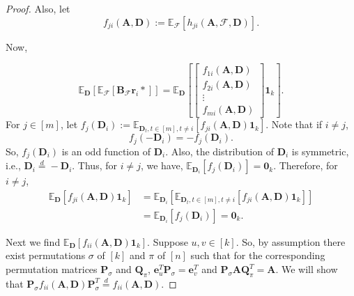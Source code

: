 \documentclass[journal,draftcls,onecolumn]{IEEEtran}
\theoremstyle{mystyle}
\newcommand{\bfD}{\mathbf{D}}
\newcommand{\bfQ}{\mathbf{Q}}
\newcommand{\bfA}{\mathbf{A}}
\newcommand{\bfB}{\mathbf{B}}
\newcommand{\bfP}{\mathbf{P}}
\newcommand{\cF}{\mathcal{F}}
\begin{document}
\begin{proof}
Also, let 
\[ f_{ji}( \mathbf{A}, \mathbf{D}) := \mathbb{E}_{\mathcal{F}}\left[h_{ji}(\mathbf{A}, \mathcal{F}, \mathbf{D})\right].\]

Now,

\[ \mathbb{E}_{\mathbf{D}} [ \mathbb{E}_{\mathcal{F}}[\mathbf{B}_{\mathcal{F}} \mathbf{r}_i*]] = \mathbb{E}_{\mathbf{D}} \left[ \begin{bmatrix}f_{1i}(\mathbf{A}, \mathbf{D}) \\ f_{2i}(\mathbf{A}, \mathbf{D})\\ \vdots \\ f_{mi}(\mathbf{A}, \mathbf{D}) \end{bmatrix} \mathbf{1}_k\right] .\]
For $j \in [m]$, let $f_j(\mathbf{D}_i)  := \mathbb{E}_{\mathbf{D}_t, t\in [m], t \ne i}[f_{ji}(\mathbf{A}, \mathbf{D}) \mathbf{1}_k] $. Note that if $i \ne j$, 
\[f_j(-\mathbf{D}_i) = - f_j(\mathbf{D}_i).\]
So, $f_j(\mathbf{D}_i)$ is an odd function of $\mathbf{D}_i$. Also, the distribution of $\mathbf{D}_i$ is symmetric, i.e., $\bfD_i \overset{d}= - \bfD_i$. Thus, for $i \ne j$, we have, $\mathbb{E}_{\mathbf{D}_i}[f_j(\mathbf{D}_i)] =  \mathbf{0}_k$.
Therefore, for $i \ne j$, 
\begin{align*}\mathbb{E}_{\mathbf{D}} [f_{ji}(\mathbf{A}, \mathbf{D}) \mathbf{1}_k] &= \mathbb{E}_{\mathbf{D}_i}[\mathbb{E}_{\mathbf{D}_t,   t \in [m], t \ne i}[f_{ji} (\mathbf{A}, \mathbf{D})\mathbf{1}_k]]\\&= \mathbb{E}_{\mathbf{D}_i}[f_j(\mathbf{D}_i)] =  \mathbf{0}_k.\end{align*}

Next we find $\mathbb{E}_{\bfD}[f_{ii}(\bfA, \bfD) \mathbf{1}_k]$. Suppose $u, v \in [k]$. So, by assumption there exist permutations $\sigma$ of $[k]$ and $\pi$ of $[n]$ such that for the corresponding permutation matrices $\bfP_{\sigma}$ and $\bfQ_{\pi}$, $\mathbf{e}_u ^T\bfP_{\sigma}= \mathbf{e}_{v}^T$ and $\bfP_{\sigma} \mathbf{A}\bfQ_{\pi}^T = \bfA$.
We will show that $\mathbf{P}_{\sigma} f_{ii}( \mathbf{A}, \mathbf{D}) \mathbf{P}_{\sigma}^T \overset{d}{=} f_{ii}( \mathbf{A}, \mathbf{D})$.



\end{proof}
\end{document}

